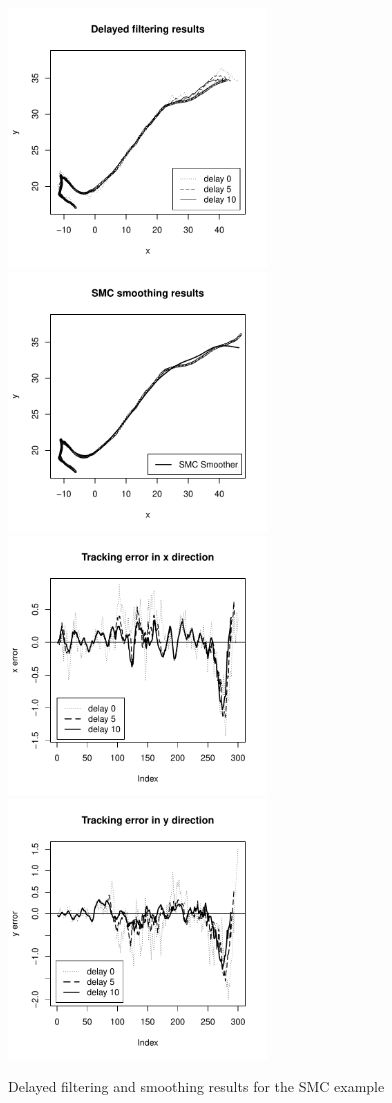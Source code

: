 \begin{figure}
\centering
\includegraphics[width=2.7in]{SMC2.pdf}
\includegraphics[width=2.7in]{SMC5.pdf}
\includegraphics[width=2.7in]{SMC3.pdf}
\includegraphics[width=2.7in]{SMC4.pdf}
\caption{Delayed filtering and smoothing results for the SMC example}
\label{fig:SMC2}
\end{figure}


